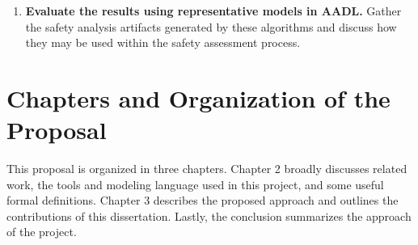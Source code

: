 \begin{enumerate}
\item \textbf{Evaluate the results using representative models in AADL.} Gather the safety analysis artifacts generated by these algorithms and discuss how they may be used within the safety assessment process.
\end{enumerate}





\section{Chapters and Organization of the Proposal}
This proposal is organized in three chapters. Chapter 2 broadly discusses related work, the tools and modeling language used in this project, and some useful formal definitions. Chapter 3 describes the proposed approach and outlines the contributions of this dissertation. Lastly, the conclusion summarizes the approach of the project.



